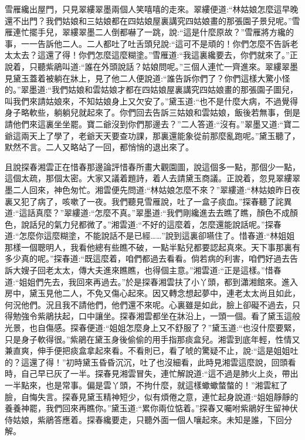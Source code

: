 \begin{parag}
    雪雁纔出屋門，只見翠縷翠墨兩個人笑嘻嘻的走來。翠縷便道:“林姑娘怎麼這早晚還不出門？我們姑娘和三姑娘都在四姑娘屋裏講究四姑娘畫的那張園子景兒呢。”雪雁連忙擺手兒，翠縷翠墨二人倒都嚇了一跳，說:“這是什麼原故？”雪雁將方纔的事，一一告訴他二人。二人都吐了吐舌頭兒說:“這可不是頑的！你們怎麼不告訴老太太去？這還了得！你們怎麼這麼糊塗。”雪雁道:“我這裏纔要去，你們就來了。”正說着，只聽紫鵑叫道:“誰在外頭說話？姑娘問呢。”三個人連忙一齊進來。翠縷翠墨見黛玉蓋着被躺在牀上，見了他二人便說道:“誰告訴你們了？你們這樣大驚小怪的。”翠墨道:“我們姑娘和雲姑娘才都在四姑娘屋裏講究四姑娘畫的那張園子圖兒，叫我們來請姑娘來，不知姑娘身上又欠安了。”黛玉道:“也不是什麼大病，不過覺得身子略軟些，躺躺兒就起來了。你們回去告訴三姑娘和雲姑娘，飯後若無事，倒是請他們來這裏坐坐罷。寶二爺沒到你們那邊去？”二人答道:“沒有。”翠墨又道:“寶二爺這兩天上了學了，老爺天天要查功課，那裏還能象從前那麼亂跑呢。”黛玉聽了，默然不言。二人又略站了一回，都悄悄的退出來了。
\end{parag}


\begin{parag}
    且說探春湘雲正在惜春那邊論評惜春所畫大觀園圖，說這個多一點，那個少一點，這個太疏，那個太密。大家又議着題詩，着人去請黛玉商議。正說着，忽見翠縷翠墨二人回來，神色匆忙。湘雲便先問道:“林姑娘怎麼不來？”翠縷道:“林姑娘昨日夜裏又犯了病了，咳嗽了一夜。我們聽見雪雁說，吐了一盒子痰血。”探春聽了詫異道:“這話真麼？”翠縷道:“怎麼不真。”翠墨道:“我們剛纔進去去瞧了瞧，顏色不成顏色，說話兒的氣力兒都微了。”湘雲道:“不好的這麼着，怎麼還能說話呢。”探春道:“怎麼你這麼糊塗，不能說話不是已經……”說到這裏卻嚥住了。惜春道:“林姐姐那樣一個聰明人，我看他總有些瞧不破，一點半點兒都要認起真來。天下事那裏有多少真的呢。”探春道:“既這麼着，咱們都過去看看。倘若病的利害，咱們好過去告訴大嫂子回老太太，傳大夫進來瞧瞧，也得個主意。”湘雲道:“正是這樣。”惜春道:“姐姐們先去，我回來再過去。”於是探春湘雲扶了小丫頭，都到瀟湘館來。進入房中，黛玉見他二人，不免又傷心起來。因又轉念想起夢中，連老太太尚且如此，何況他們。況且我不請他們，他們還不來呢。心裏雖是如此，臉上卻礙不過去，只得勉強令紫鵑扶起，口中讓坐。探春湘雲都坐在牀沿上，一頭一個。看了黛玉這般光景，也自傷感。探春便道:“姐姐怎麼身上又不舒服了？”黛玉道:“也沒什麼要緊，只是身子軟得很。”紫鵑在黛玉身後偷偷的用手指那痰盒兒。湘雲到底年輕，性情又兼直爽，伸手便把痰盒拿起來看。不看則已，看了唬的驚疑不止，說:“這是姐姐吐的？這還了得！”初時黛玉昏昏沉沉，吐了也沒細看，此時見湘雲這麼說，回頭看時，自己早已灰了一半。探春見湘雲冒失，連忙解說道:“這不過是肺火上炎，帶出一半點來，也是常事。偏是雲丫頭，不拘什麼，就這樣蠍蠍螫螫的！”湘雲紅了臉，自悔失言。探春見黛玉精神短少，似有煩倦之意，連忙起身說道:“姐姐靜靜的養養神罷，我們回來再瞧你。”黛玉道:“累你兩位惦着。”探春又囑咐紫鵑好生留神伏侍姑娘，紫鵑答應着。探春纔要走，只聽外面一個人嚷起來。未知是誰，下回分解。
\end{parag}